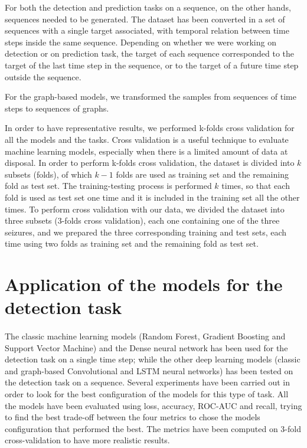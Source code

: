 For both the detection and prediction tasks on a sequence, on the other hands, sequences needed to be generated. The dataset has been converted in a set of sequences with a single target associated, with temporal relation between time steps inside the same sequence. Depending on whether we were working on detection or on prediction task, the target of each sequence corresponded to the target of the last time step in the sequence, or to the target of a future time step outside the sequence.

For the graph-based models, we transformed the samples from sequences of time steps to sequences of graphs.

In order to have representative results, we performed k-folds cross validation for all the models and the tasks. Cross validation is a useful technique to evaluate machine learning models, especially when there is a limited amount of data at disposal. In order to perform k-folds cross validation, the dataset is divided into $k$ subsets (folds), of which $k-1$ folds are used as training set and the remaining fold as test set. The training-testing process is performed $k$ times, so that each fold is used as test set one time and it is included in the training set all the other times. To perform cross validation with our data, we divided the dataset into three subsets (3-folds cross validation), each one containing one of the three seizures, and we prepared the three corresponding training and test sets, each time using two folds as training set and the remaining fold as test set.


\section{Application of the models for the detection task} \label{sec: step_models_detection_task}
\paragraph{} The classic machine learning models (Random Forest, Gradient Boosting and Support Vector Machine) and the Dense neural network has been used for the detection task on a single time step; while the other deep learning models (classic and graph-based Convolutional and LSTM neural networks) has been tested on the detection task on a sequence. Several experiments have been carried out in order to look for the best configuration of the models for this type of task. All the models have been evaluated using loss, accuracy, ROC-AUC and recall, trying to find the best trade-off between the four metrics to chose the models configuration that performed the best. The metrics have been computed on 3-fold cross-validation to have more realistic results.


